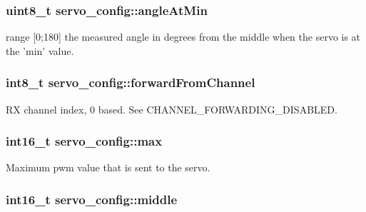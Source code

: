\hypertarget{structservo__config_a1db90f6f1f2152b1925f721b5bd8106a}{
\subsubsection[{angle\+At\+Min}]{\setlength{\rightskip}{0pt plus 5cm}uint8\+\_\+t servo\+\_\+config\+::angle\+At\+Min}}\label{structservo__config_a1db90f6f1f2152b1925f721b5bd8106a}


range \mbox{[}0;180\mbox{]} the measured angle in degrees from the middle when the servo is at the 'min' value. 

\hypertarget{structservo__config_a6996b5fd6729b2ce566f355c4e62bd4e}{
\subsubsection[{forward\+From\+Channel}]{\setlength{\rightskip}{0pt plus 5cm}int8\+\_\+t servo\+\_\+config\+::forward\+From\+Channel}}\label{structservo__config_a6996b5fd6729b2ce566f355c4e62bd4e}


R\+X channel index, 0 based. See C\+H\+A\+N\+N\+E\+L\+\_\+\+F\+O\+R\+W\+A\+R\+D\+I\+N\+G\+\_\+\+D\+I\+S\+A\+B\+L\+E\+D. 

\hypertarget{structservo__config_a838c63fb621bfa9bec579d52d1a81177}{
\subsubsection[{max}]{\setlength{\rightskip}{0pt plus 5cm}int16\+\_\+t servo\+\_\+config\+::max}}\label{structservo__config_a838c63fb621bfa9bec579d52d1a81177}


Maximum pwm value that is sent to the servo. 

\hypertarget{structservo__config_a8ba992e9b21b0e0c308fcc554709f690}{
\subsubsection[{middle}]{\setlength{\rightskip}{0pt plus 5cm}int16\+\_\+t servo\+\_\+config\+::middle}}\label{structservo__config_a8ba992e9b21b0e0c308fcc554709f690}


